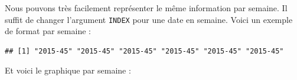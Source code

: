 \documentclass[]{book}
\newenvironment{Shaded}{\begin{snugshade}}{\end{snugshade}}
\newcommand{\DataTypeTok}[1]{\textcolor[rgb]{0.13,0.29,0.53}{#1}}
\newcommand{\KeywordTok}[1]{\textcolor[rgb]{0.13,0.29,0.53}{\textbf{#1}}}
\newcommand{\NormalTok}[1]{#1}
\newcommand{\OperatorTok}[1]{\textcolor[rgb]{0.81,0.36,0.00}{\textbf{#1}}}
\newcommand{\StringTok}[1]{\textcolor[rgb]{0.31,0.60,0.02}{#1}}
\begin{document}
Nous pouvons très facilement représenter le même information par semaine. Il suffit de changer l'argument \texttt{INDEX} pour une date en semaine. Voici un exemple de format par semaine :

\begin{Shaded}
\end{Shaded}

\begin{verbatim}
## [1] "2015-45" "2015-45" "2015-45" "2015-45" "2015-45" "2015-45"
\end{verbatim}

Et voici le graphique par semaine :
\end{document}
